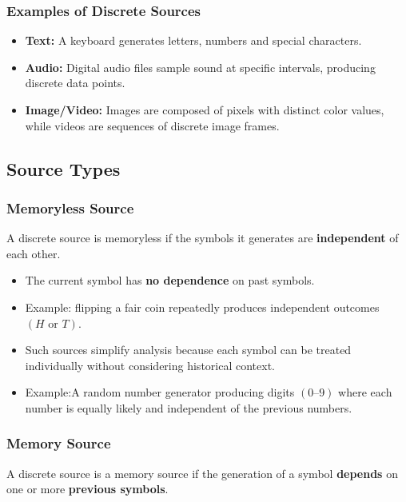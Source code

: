 \documentclass[11pt,a4paper]{book}
\newenvironment{definitionbox}[1][Definition]{%
    \begin{tcolorbox}[
        enhanced,
        breakable,
        colback=primaryblue!10,
        colframe=primaryblue!150,
        title=#1,
        fonttitle=\bfseries,
        sharp corners,
        boxrule=0.8pt,
        left=8pt,
        right=8pt,
        top=6pt,
        bottom=6pt
    ]
}{\end{tcolorbox}}
\begin{document}
\subsubsection{Examples of Discrete Sources}
\begin{itemize}
    \item \textbf{Text:} A keyboard generates letters, numbers and special characters.
    \item \textbf{Audio:} Digital audio files sample sound at specific intervals, producing discrete data points.
    \item \textbf{Image/Video:} Images are composed of pixels with distinct color values, while videos are sequences of discrete image frames.
\end{itemize}

\subsection{Source Types}
\subsubsection{Memoryless Source}

\begin{definitionbox}[Memoryless Source]
A discrete source is memoryless if the symbols it generates are \textbf{independent} of each other.
\end{definitionbox}

\begin{itemize}
    \item The current symbol has \textbf{no dependence} on past symbols.
    \item Example: flipping a fair coin repeatedly produces independent outcomes $(H \text{ or } T)$.
    \item Such sources simplify analysis because each symbol can be treated individually without considering historical context.
    \item Example:A random number generator producing digits $(0\text{--}9)$ where each number is equally likely and independent of the previous numbers.
\end{itemize}

\subsubsection{Memory Source}

\begin{definitionbox}[Memory Source]
A discrete source is a memory source if the generation of a symbol \textbf{depends} on one or more \textbf{previous symbols}.
\end{definitionbox}
\end{document}
